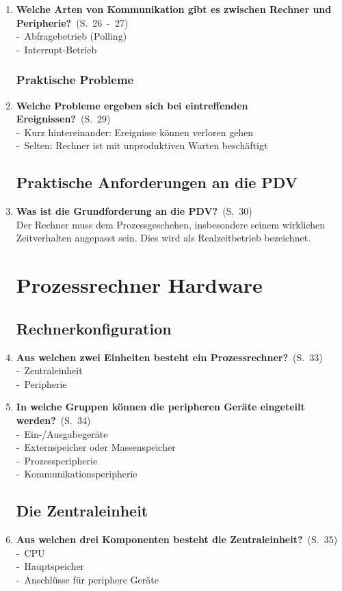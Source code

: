 \documentclass[a4paper,12pt]{article}
\newcommand{\question}[3]{\pagebreak[3]\item {\textbf{#1?}}\ (S.\ #2)#3}
\newcommand{\catchword}[1]{\\-\ #1}
\newcommand{\normaltext}[1]{\\#1}
\newcommand{\page}[1]{#1}
\newcommand{\pages}[2]{#1\ -\ #2}
\begin{document}
\begin{enumerate}
  \question{Welche Arten von Kommunikation gibt es zwischen Rechner und Peripherie}{\pages{26}{27}}
  {
    \catchword{Abfragebetrieb (Polling)}
    \catchword{Interrupt-Betrieb}
  }

  \subsubsection{Praktische Probleme}

  \question{Welche Probleme ergeben sich bei eintreffenden Ereignissen}{\page{29}}
  {
    \catchword{Kurz hintereinander: Ereignisse können verloren gehen}
    \catchword{Selten: Rechner ist mit unproduktiven Warten beschäftigt}
  }

  \subsection{Praktische Anforderungen an die PDV}

  \question{Was ist die Grundforderung an die PDV}{\page{30}}
  {
    \normaltext{Der Rechner muss dem Prozessgeschehen, insbesondere seinem wirklichen
                Zeitverhalten angepasst sein. Dies wird als Realzeitbetrieb bezeichnet.}
  }

  \newpage
  \section{Prozessrechner Hardware}

  \subsection{Rechnerkonfiguration}

  \question{Aus welchen zwei Einheiten besteht ein Prozessrechner}{\page{33}}
  {
    \catchword{Zentraleinheit}
    \catchword{Peripherie}
  }

  \question{In welche Gruppen können die peripheren Geräte eingeteilt werden}{\page{34}}
  {
    \catchword{Ein-/Ausgabegeräte}
    \catchword{Externspeicher oder Massenspeicher}
    \catchword{Prozessperipherie}
    \catchword{Kommunikationsperipherie}
  }

  \subsection{Die Zentraleinheit}

  \question{Aus welchen drei Komponenten besteht die Zentraleinheit}{\page{35}}
  {
    \catchword{CPU}
    \catchword{Hauptspeicher}
    \catchword{Anschlüsse für periphere Geräte}
  }


\end{enumerate}
\end{document}
